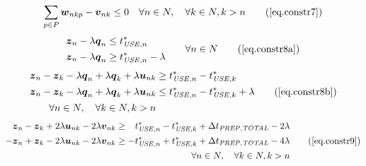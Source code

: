\begin{equation}
    \sum_{p \in P} \boldsymbol{w}_{nkp} - \boldsymbol{v}_{nk} \le 0 \quad
    \forall n \in N, \quad \forall k \in N, k > n
    \tag{\ref{eq.constr7}}
\end{equation}
\begin{equation}
    \begin{split}
        \begin{alignedat}{2}
            \boldsymbol{z}_{n} & {}-{} & \lambda \boldsymbol{q}_{n} & \le
            t_{\mathit{USE},n}^{*}\\
            \boldsymbol{z}_{n} & {}-{} & \lambda \boldsymbol{q}_{n} & \ge
            t_{\mathit{USE},n}^{*} - \lambda
        \end{alignedat}
    \end{split}
    \quad\quad
    \begin{split}
        \forall n \in N
    \end{split}
    \tag{\ref{eq.constr8a}}
\end{equation}
\begin{equation}
    \begin{split}
        \boldsymbol{z}_{n} - \boldsymbol{z}_{k} - \lambda \boldsymbol{q}_{n}
        + \lambda \boldsymbol{q}_{k} + \lambda \boldsymbol{u}_{nk} &\ge
        t_{\mathit{USE},n}^{*} - t_{\mathit{USE},k}^{*}\\
        \boldsymbol{z}_{n} - \boldsymbol{z}_{k} - \lambda \boldsymbol{q}_{n}
        + \lambda \boldsymbol{q}_{k} + \lambda \boldsymbol{u}_{nk} &\le
        t_{\mathit{USE},n}^{*} - t_{\mathit{USE},k}^{*} + \lambda\\
        \forall n \in N, \quad \forall k \in N, k > n
    \end{split}
    \tag{\ref{eq.constr8b}}
\end{equation}
\begin{equation}
    \begin{split}
        \begin{alignedat}{10}
            &\boldsymbol{z}_{n} {}-{} &\boldsymbol{z}_{k} {}+{} &2 \lambda
            \boldsymbol{u}_{nk} {}-{} &2 \lambda \boldsymbol{v}_{nk} &\ge
            &t_{\mathit{USE},n}^{*} {}-{} &t_{\mathit{USE},k}^{*} {}+{}
            &\Delta &t_{\mathit{PREP,TOTAL}} {}-{} 2 &\lambda\\
            - &\boldsymbol{z}_{n} {}+{} &\boldsymbol{z}_{k} {}-{} &2 \lambda
            \boldsymbol{u}_{nk} {}-{} &2 \lambda \boldsymbol{v}_{nk} &\ge
            - &t_{\mathit{USE},n}^{*} {}+{} &t_{\mathit{USE},k}^{*} {}+{}
            &\Delta &t_{\mathit{PREP,TOTAL}} {}-{} 4 &\lambda
        \end{alignedat}
        \\\forall n \in N, \quad \forall k \in N, k > n
    \end{split}
    \tag{\ref{eq.constr9}}
\end{equation}

